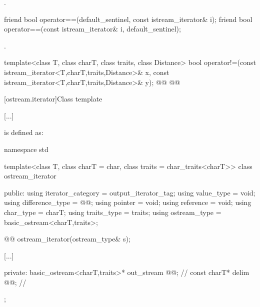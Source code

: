 \begin{itemdescr}
\pnum
\returns
{}.
\end{itemdescr}

\begin{addedblock}
%
\begin{itemdecl}
friend bool operator==(default_sentinel, const istream_iterator& i);
friend bool operator==(const istream_iterator& i, default_sentinel);
\end{itemdecl}

\begin{itemdescr}
\pnum
\returns
{}.
\end{itemdescr}
\end{addedblock}

%
\begin{itemdecl}
template<class T, class charT, class traits, class Distance>
  bool operator!=(const istream_iterator<T,charT,traits,Distance>& x,
                  const istream_iterator<T,charT,traits,Distance>& y);
@@
@@
\end{itemdecl}

\begin{itemdescr}
\pnum
\returns
{}
\end{itemdescr}


[ostream.iterator]{Class template }

[...]

\setcounter{Paras}{1}
\pnum {} is defined as:

\begin{codeblock}
namespace std {
  template<class T, class charT = char, class traits = char_traits<charT>>
  class ostream_iterator {
  public:
    using iterator_category = output_iterator_tag;
    using value_type        = void;
    using difference_type   = @@;
    using pointer           = void;
    using reference         = void;
    using char_type         = charT;
    using traits_type       = traits;
    using ostream_type      = basic_ostream<charT,traits>;

    @@
    ostream_iterator(ostream_type& s);

    [...]

  private:
    basic_ostream<charT,traits>* out_stream @@;  // \expos
    const charT* delim @@;                       // \expos
  };
}
\end{codeblock}

